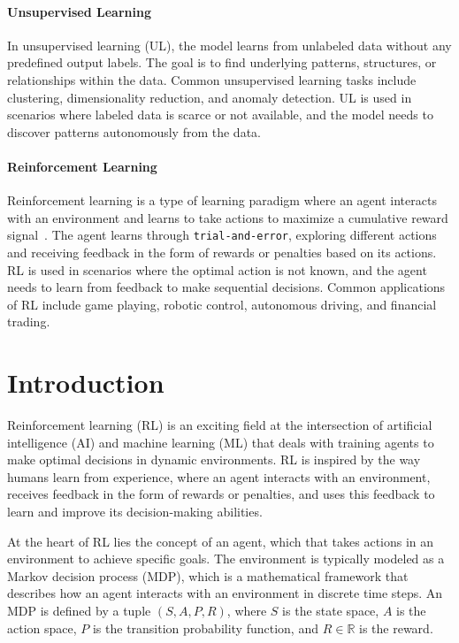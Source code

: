 \documentclass[../xlapes02]{subfiles}
\begin{document}
    \paragraph{Unsupervised Learning}
    In unsupervised learning (UL), the model learns from unlabeled data without any predefined output labels. The goal is to find underlying patterns, structures, or relationships within the data. Common unsupervised learning tasks include clustering, dimensionality reduction, and anomaly detection. UL is used in scenarios where labeled data is scarce or not available, and the model needs to discover patterns autonomously from the data.

    \paragraph{Reinforcement Learning}
    Reinforcement learning is a type of learning paradigm where an agent interacts with an environment and learns to take actions to maximize a cumulative reward signal~\cite{sutton2018reinforcement}. The agent learns through \texttt{trial-and-error}, exploring different actions and receiving feedback in the form of rewards or penalties based on its actions. RL is used in scenarios where the optimal action is not known, and the agent needs to learn from feedback to make sequential decisions. Common applications of RL include game playing, robotic control, autonomous driving, and financial trading.


    \section{Introduction}\label{sec:rl-introduction}
    Reinforcement learning (RL) is an exciting field at the intersection of artificial intelligence (AI) and machine learning (ML) that deals with training agents to make optimal decisions in dynamic environments. RL is inspired by the way humans learn from experience, where an agent interacts with an environment, receives feedback in the form of rewards or penalties, and uses this feedback to learn and improve its decision-making abilities.

    At the heart of RL lies the concept of an agent, which that takes actions in an environment to achieve specific goals. The environment is typically modeled as a Markov decision process (MDP), which is a mathematical framework that describes how an agent interacts with an environment in discrete time steps. An MDP is defined by a tuple $(S, A, P, R)$, where $S$ is the state space, $A$ is the action space, $P$ is the transition probability function, and $R\in\mathbb{R}$ is the reward.
\end{document}

